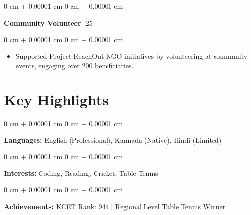 \documentclass[10pt, letterpaper]{article}
\newenvironment{highlights}{
    \begin{itemize}[
        topsep=0.10 cm,
        parsep=0.10 cm,
        partopsep=0pt,
        itemsep=0pt,
        leftmargin=0 cm + 10pt
    ]
}{
    \end{itemize}
} %
\newenvironment{onecolentry}{
    \begin{adjustwidth}{
        0 cm + 0.00001 cm
    }{
        0 cm + 0.00001 cm
    }
}{
    \end{adjustwidth}
} %
\newenvironment{twocolentry}[2][]{
    \onecolentry
    \def\secondColumn{#2}
    \setcolumnwidth{\fill, 4.5 cm}
    \begin{paracol}{2}
}{
    \switchcolumn \raggedleft \secondColumn
    \end{paracol}
    \endonecolentry
} %
\begin{document}
        \vspace{0.2 cm}

        \begin{twocolentry}{
            2024-25
        }
            \textbf{Community Volunteer}\end{twocolentry}

        \vspace{0.05 cm}
        \begin{onecolentry}
            \begin{highlights}
                \item Supported Project ReachOut NGO initiatives by volunteering at community events, engaging over 200 beneficiaries.
            \end{highlights}
        \end{onecolentry}
    \section{Key Highlights}

        \begin{onecolentry}
            \textbf{Languages:} English (Professional), Kannada (Native), Hindi (Limited)
        \end{onecolentry}

        \vspace{0.2 cm}

        \begin{onecolentry}
            \textbf{Interests:} Coding, Reading, Cricket, Table Tennis
        \end{onecolentry}

        \vspace{0.2 cm}

        \begin{onecolentry}
            \textbf{Achievements:} KCET Rank: 944 | Regional Level Table Tennis Winner
        \end{onecolentry}
   
\end{document}

